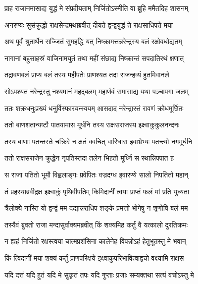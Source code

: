 \twolineshloka
{प्राह राजानमासाद्य युद्धं मे संप्रदीयताम्}
{निर्जितोऽस्मीति वा ब्रूहि ममैतदिह शासनम्} %

\twolineshloka
{अनरण्यः सुसंक्रुद्धो राक्षसेन्द्रमथाब्रवीत्}
{दीयते द्वन्द्वयुद्धं ते राक्षसाधिपते मया} %

\twolineshloka
{अथ पूर्वं श्रुतार्थेन सज्जितं सुमहद्धि यत्}
{निष्क्रामत्तन्नरेन्द्रस्य बलं रक्षोवधोद्यतम्} %

\twolineshloka
{नागानां बहुसाहस्रं वाजिनामयुतं तथा}
{महीं संछाद्य निष्क्रान्तं सपदातिरथं क्षणात्} %

\twolineshloka
{तद्रावणबलं प्राप्य बलं तस्य महीपतेः}
{प्राणश्यत तदा राजन्हव्यं हुतमिवानले} %

\twolineshloka
{सोऽपश्यत नरेन्द्रस्तु नश्यमानं महद्बलम्}
{महार्णवं समासाद्य यथा पञ्चापगा जलम्} %

\twolineshloka
{ततः शक्रधनुःप्रख्यं धनुर्विस्फारयन्स्वयम्}
{आसदाद नरेन्द्रास्तं रावणं क्रोधमूर्छितः} %

\twolineshloka
{ततो बाणशतान्यष्टौ पातयामास मूर्धनि}
{तस्य राक्षसराजस्य इक्ष्वाकुकुलनन्दनः} %

\twolineshloka
{तस्य बाणाः पतन्तस्ते चक्रिरे न क्षतं क्वचित्}
{वारिधारा इवाभ्रेभ्यः पतन्त्यो नगमूर्धनि} %

\twolineshloka
{ततो राक्षसराजेन क्रुद्धेन नृपतिस्तदा}
{तलेन भिहतो मूर्ध्नि स रथान्निपपात ह} %

\twolineshloka
{स राजा पतितो भूमौ विह्वलाङ्गः प्रवेपितः}
{वज्रदग्ध इवारण्ये सालो निपतितो महान्} %

\twolineshloka
{तं प्रहस्याब्रवीद्रक्ष इक्ष्वाकुं पृथिवीपतिम्}
{किमिदानीं त्वया प्राप्तं फलं मां प्रति युध्यता} %

\twolineshloka
{त्रैलोक्ये नास्ति यो द्वन्द्वं मम दद्यान्नराधिप}
{शङ्के प्रमत्तो भोगेषु न शृणोषि बलं मम} %

\twolineshloka
{तस्यैवं ब्रुवतो राजा मन्दासुर्वाक्यमब्रवीत्}
{किं शक्यमिह कर्तुं वै यत्कालो दुरतिक्रमः} %

\twolineshloka
{न ह्यहं निर्जितो रक्षस्त्वया चात्मप्रशंसिना}
{कालेनेह विपन्नोऽहं हेतुभूतस्तु मे भवान्} %

\twolineshloka
{किं त्विदानीं मया शक्यं कर्तुं प्राणपरिक्षये}
{इक्ष्वाकुपरिभावित्वाद्वचो वक्ष्यामि राक्षस} %

\twolineshloka
{यदि दत्तं यदि हुतं यदि मे सुकृतं तपः}
{यदि गुप्ताः प्रजाः सम्यक्तथा सत्यं वचोऽस्तु मे} %

